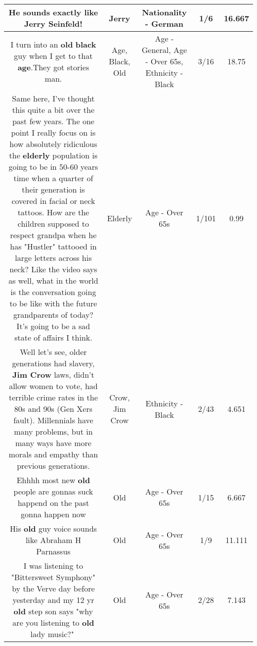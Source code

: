 \documentclass[11pt]{article}
\newlength\mylength
\begin{document}
\begin{center}
\begin{longtable}{|C{.65\mylength}|C{.30\mylength}|C{.12\mylength}|C{.12\mylength}|C{.12\mylength}|}
  \small He sounds exactly like \textbf{Jerry} Seinfeld!\normalsize   & Jerry & Nationality - German & 1/6 & 16.667 \\  \hline
  \small I turn into an \textbf{old} \textbf{black} guy when I get to that \textbf{age}.They got stories man.\normalsize   & Age, Black, Old & Age - General, Age - Over 65s, Ethnicity - Black & 3/16 & 18.75 \\  \hline
  \small Same here, I've thought this quite a bit over the past few years. The one point I really focus on is how absolutely ridiculous the \textbf{elderly} population is going to be in 50-60 years time when a quarter of their generation is covered in facial or neck tattoos. How are the children supposed to respect grandpa when he has "Hustler" tattooed in large letters across his neck?  Like the video says as well, what in the world is the conversation going to be like with the future grandparents of today? It's going to be a sad state of affairs I think.\normalsize   & Elderly & Age - Over 65s & 1/101 & 0.99 \\  \hline
  \small Well let's see, older generations had slavery, \textbf{Jim C\textbf{row}} laws, didn't allow women to vote, had terrible crime rates in the 80s and 90s (Gen Xers fault).  Millennials have many problems, but in many ways have more morals and empathy than previous generations.\normalsize   & Crow, Jim Crow & Ethnicity - Black & 2/43 & 4.651 \\  \hline
  \small Ehhhh most new \textbf{old} people are gonnas suck happend on the past gonna happen now\normalsize   & Old & Age - Over 65s & 1/15 & 6.667 \\  \hline
  \small His \textbf{old} guy voice sounds like Abraham H Parnassus\normalsize   & Old & Age - Over 65s & 1/9 & 11.111 \\  \hline
  \small I was listening to "Bittersweet Symphony" by the Verve day before yesterday and my 12 yr \textbf{old} step son says "why are you listening to \textbf{old} lady music?"😬\normalsize   & Old & Age - Over 65s & 2/28 & 7.143 \\  \hline

\end{longtable}
\end{center}
\end{document}
